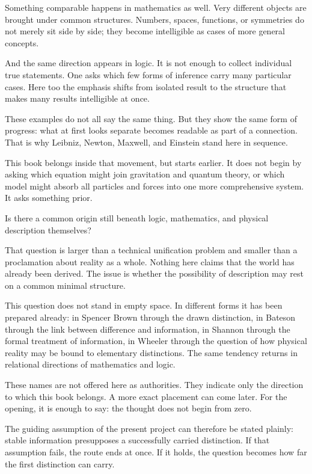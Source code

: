 \documentclass[11pt,a4paper]{book}
\begin{document}
Something comparable happens in mathematics as well. Very different objects
are brought under common structures. Numbers, spaces, functions, or
symmetries do not merely sit side by side; they become intelligible as cases
of more general concepts.

And the same direction appears in logic. It is not enough to collect
individual true statements. One asks which few forms of inference carry many
particular cases. Here too the emphasis shifts from isolated result to the
structure that makes many results intelligible at once.

These examples do not all say the same thing. But they show the same form of
progress: what at first looks separate becomes readable as part of a
connection. That is why Leibniz, Newton, Maxwell, and Einstein stand here in
sequence.

This book belongs inside that movement, but starts earlier. It does not
begin by asking which equation might join gravitation and quantum theory, or
which model might absorb all particles and forces into one more
comprehensive system. It asks something prior.

Is there a common origin still beneath logic, mathematics, and physical
description themselves?

That question is larger than a technical unification problem and smaller
than a proclamation about reality as a whole. Nothing here claims that the
world has already been derived. The issue is whether the possibility of
description may rest on a common minimal structure.

This question does not stand in empty space. In different forms it has been
prepared already: in Spencer Brown through the drawn distinction, in Bateson
through the link between difference and information, in Shannon through the
formal treatment of information, in Wheeler through the question of how
physical reality may be bound to elementary distinctions. The same tendency
returns in relational directions of mathematics and logic.

These names are not offered here as authorities. They indicate only the
direction to which this book belongs. A more exact placement can come later.
For the opening, it is enough to say: the thought does not begin from zero.

The guiding assumption of the present project can therefore be stated
plainly: stable information presupposes a successfully carried distinction.
If that assumption fails, the route ends at once. If it holds, the question
becomes how far the first distinction can carry.
\end{document}
